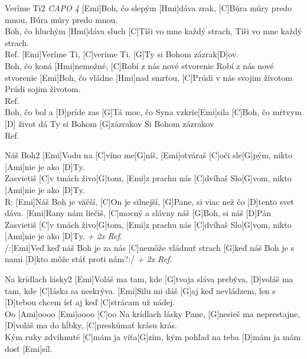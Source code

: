 \documentclass[12pt]{article}
\begin{document}
\begin{song}{Veríme Ti}{2}
	\textit{CAPO 4}
	[Emi]Boh, čo slepým [Hmi]dáva zrak,
	[C]Búra múry predo mnou,
	Búra múry predo mnou.
	\\
	[Emi]Boh, čo hluchým [Hmi]dáva sluch
	[C]Tíši vo mne každý strach,
	Tíši vo mne každý strach.
	\\
	Ref. [Emi]Veríme Ti, [C]veríme Ti,
	[G]Ty si Bohom zázrak[D]ov.
	\\
	[Emi]Boh, čo koná [Hmi]nemožné,
	[C]Robí z nás nové stvorenie
	Robí z nás nové stvorenie
	[Emi]Boh, čo vládne [Hmi]nad smrťou,
	[C]Prúdi v nás svojim životom
	Prúdi sojim životom.
	\\
	Ref.
	\\
	[G]Boh, čo bol a [D]príde zas
	[G]Tá moc, čo Syna vzkrie[Emi]sila
	[C]Boh, čo mŕtvym [D] život dá
	Ty si Bohom [G]zázrakov
	Si Bohom zázrakov
	\\
	Ref.
\end{song}

\begin{song}{Náš Boh}{2}
	[Emi]Vodu na [C]víno me[G]níš,
	[Emi]otváraš [C]oči sle[G]pým,
	nikto [Ami]nie je ako [D]Ty.
	\\
	[Emi]Zasvietiš [C]v tmách živo[G]tom,
	[Emi]z prachu nás [C]dvíhaš Slo[G]vom,
	nikto [Ami]nie je ako [D]Ty.
	\\
	R: [Emi]Náš Boh je väčší, [C]On je silnejší,
	[G]Pane, si viac než čo [D]tento svet dáva.
	[Emi]Rany nám liečiš, [C]mocný a slávny
	náš [G]Boh, si náš [D]Pán
	\columnbreak
	[Emi]Zasvietiš [C]v tmách živo[G]tom,
	[Emi]z prachu nás [C]dvíhaš Slo[G]vom,
	nikto [Ami]nie je ako [D]Ty. \textit{+ 2x Ref.}
	\\
	/:[Emi]Veď keď náš Boh je za nás
	[C]nemôže vládnuť strach
	[G]keď náš Boh je s nami
	[D]kto môže stáť proti nám?:/ \textit{+ 2x Ref.}
\end{song}

\begin{song}{Na krídlach lásky}{2}
	[Emi]Voláš ma tam, kde [G]tvoja sláva prebýva,
	[D]voláš ma tam, kde [C]láska sa neskrýva.
	[Emi]Silu mi dáš [G]aj keď nevládzem,
	len s [D]tebou chcem ísť 
	aj keď [C]strácam už nádej.
	\\
	[G]Oo  [Ami]oooo  [Emi]oooo  [C]oo
	\columnbreak
	[Emi]Na krídlach lásky Pane,
	[G]nesieš ma neprestajne,
	[D]voláš ma do hĺbky,
	[C]preskúmať krásu krás.
	\\
	[Emi]Kým ruky zdvihnuté [C]mám
	ja víťa[G]zím,
	kým pohľad na teba [D]mám
	ja mám dosť [Emi]síl.
\end{song}
\end{document}
